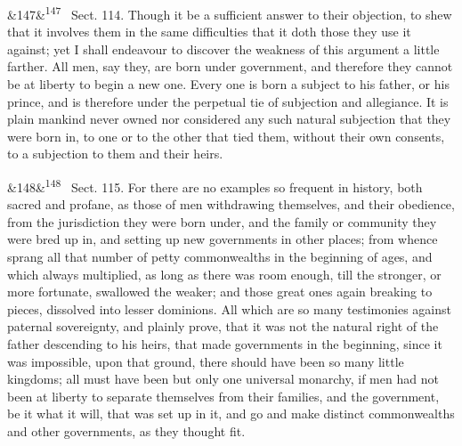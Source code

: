 \documentclass[12pt]{article}
\newcommand{\para}[1][]{\par\noindent\ifx&#1&\else\textsuperscript{\footnotesize #1}~\fi}
\begin{document}
\para[147] Sect. 114. Though it be a sufficient answer to their objection, to shew that it involves them in the same difficulties that it doth those they use it against; yet I shall endeavour to discover the weakness of this argument a little farther. All men, say they, are born under government, and therefore they cannot be at liberty to begin a new one. Every one is born a subject to his father, or his prince, and is therefore under the perpetual tie of subjection and allegiance. It is plain mankind never owned nor considered any such natural subjection that they were born in, to one or to the other that tied them, without their own consents, to a subjection to them and their heirs.

\para[148] Sect. 115. For there are no examples so frequent in history, both sacred and profane, as those of men withdrawing themselves, and their obedience, from the jurisdiction they were born under, and the family or community they were bred up in, and setting up new governments in other places; from whence sprang all that number of petty commonwealths in the beginning of ages, and which always multiplied, as long as there was room enough, till the stronger, or more fortunate, swallowed the weaker; and those great ones again breaking to pieces, dissolved into lesser dominions. All which are so many testimonies against paternal sovereignty, and plainly prove, that it was not the natural right of the father descending to his heirs, that made governments in the beginning, since it was impossible, upon that ground, there should have been so many little kingdoms; all must have been but only one universal monarchy, if men had not been at liberty to separate themselves from their families, and the government, be it what it will, that was set up in it, and go and make distinct commonwealths and other governments, as they thought fit.
\end{document}
